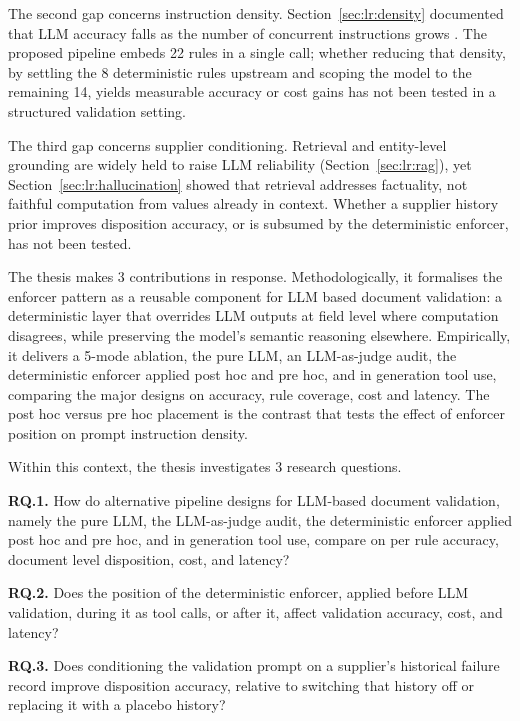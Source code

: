 The second gap concerns instruction density. Section~\ref{sec:lr:density} documented that LLM accuracy falls as the number of concurrent instructions grows \citep{jaroslawicz2025,tam2024,gozzi2024}. The proposed pipeline embeds 22 rules in a single call; whether reducing that density, by settling the 8 deterministic rules upstream and scoping the model to the remaining 14, yields measurable accuracy or cost gains has not been tested in a structured validation setting.

The third gap concerns supplier conditioning. Retrieval and entity-level grounding are widely held to raise LLM reliability (Section~\ref{sec:lr:rag}), yet Section~\ref{sec:lr:hallucination} showed that retrieval addresses factuality, not faithful computation from values already in context. Whether a supplier history prior improves disposition accuracy, or is subsumed by the deterministic enforcer, has not been tested.

The thesis makes 3 contributions in response. Methodologically, it formalises the enforcer pattern as a reusable component for LLM based document validation: a deterministic layer that overrides LLM outputs at field level where computation disagrees, while preserving the model's semantic reasoning elsewhere. Empirically, it delivers a 5-mode ablation, the pure LLM, an LLM-as-judge audit, the deterministic enforcer applied post hoc and pre hoc, and in generation tool use, comparing the major designs on accuracy, rule coverage, cost and latency. The post hoc versus pre hoc placement is the contrast that tests the effect of enforcer position on prompt instruction density.

Within this context, the thesis investigates 3 research questions.

\textbf{RQ.1.} How do alternative pipeline designs for LLM-based document validation, namely the pure LLM, the LLM-as-judge audit, the deterministic enforcer applied post hoc and pre hoc, and in generation tool use, compare on per rule accuracy, document level disposition, cost, and latency?

\textbf{RQ.2.} Does the position of the deterministic enforcer, applied before LLM validation, during it as tool calls, or after it, affect validation accuracy, cost, and latency?

\textbf{RQ.3.} Does conditioning the validation prompt on a supplier's historical failure record improve disposition accuracy, relative to switching that history off or replacing it with a placebo history?
